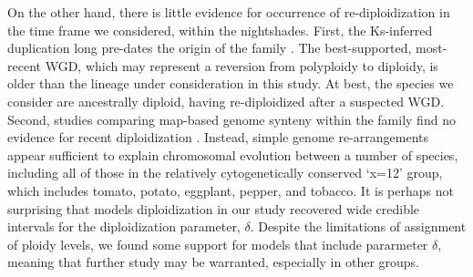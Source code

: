 On the other hand, there is little evidence for occurrence of re-diploidization in the time frame we considered, within the nightshades.
First, the Ks-inferred duplication long pre-dates the origin of the family \citep{sarkinen_2013}. 
The best-supported, most-recent WGD, which may represent a reversion from polyploidy to diploidy, is older than the lineage under consideration in this study.
At best, the species we consider are ancestrally diploid, having re-diploidized after a suspected WGD.
Second, studies comparing map-based genome synteny within the family find no evidence for recent diploidization \citep{wu_2010a}.
Instead, simple genome re-arrangements appear sufficient to explain chromosomal evolution between a number of species, including all of those in the relatively cytogenetically conserved `x=12' group, which includes tomato, potato, eggplant, pepper, and tobacco.
It is perhaps not surprising that models diploidization in our study recovered wide credible intervals for the diploidization parameter, $\delta$. 
Despite the limitations of assignment of ploidy levels, we found some support for models that include pararmeter $\delta$, meaning that further study may be warranted, especially in other groups.

%

